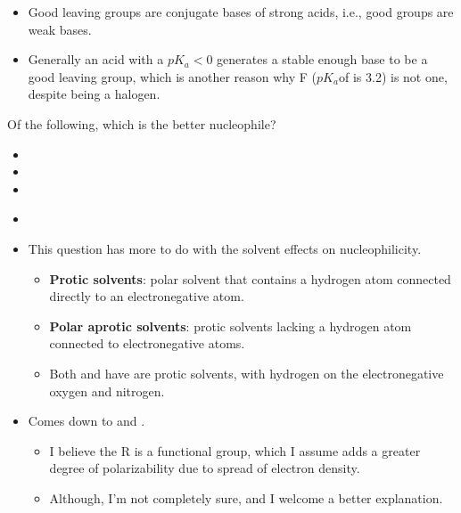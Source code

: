 \documentclass[12pt,a4paper]{article}
\begin{document}
\begin{enumerate}
\begin{itemize}
\begin{itemize}
            \begin{itemize}
                \item Good leaving groups are conjugate bases of strong acids, i.e., good groups are weak bases.
                \item Generally an acid with a \(pK_a < 0\) generates a stable enough base to be a good leaving group, which is another reason why F (\(pK_a\)of  is 3.2) is not one, despite being a halogen.
            \end{itemize}
        \end{itemize}
    \end{itemize}
    {\color{G-Moon}\item Of the following, which is the better nucleophile?
    \begin{itemize}
        \item {}
        \item {}
        \item {}
        \item {\color{o-Sun}\textbf{}}
    \end{itemize}
    }
    \begin{itemize}
        \item This question has more to do with the solvent effects on nucleophilicity.
            \begin{itemize}
                \item \textbf{Protic solvents}: polar solvent that {\color{o-Sun}contains} a hydrogen atom connected directly to an electronegative atom. 
                \item \textbf{Polar aprotic solvents}: protic solvents {\color{o-Sun}lacking} a hydrogen atom connected to electronegative atoms.
                \item Both  and  have are protic solvents, with hydrogen on the electronegative oxygen and nitrogen.
            \end{itemize}
        \item Comes down to  and .
            \begin{itemize}
                \item I believe the R is a functional group, which I assume adds a greater degree of polarizability due to spread of electron density. 
                \item Although, I'm not completely sure, and I welcome a better explanation.
            \end{itemize}
    \end{itemize}
\end{enumerate}
\end{document}
